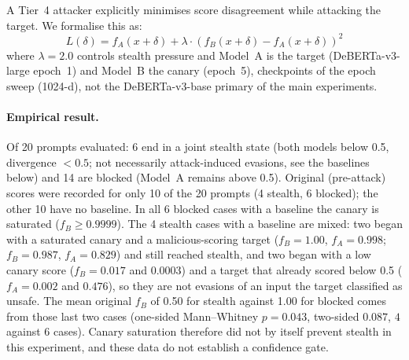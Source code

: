 \documentclass{article}
\begin{document}
A Tier~4 attacker explicitly minimises score disagreement while attacking the target. We formalise this as:
\begin{equation}
\label{eq:div-min-loss}
L(\delta) = f_A(x + \delta) + \lambda \cdot (f_B(x + \delta) - f_A(x + \delta))^2
\end{equation}
where $\lambda = 2.0$ controls stealth pressure and Model~A is the target (DeBERTa-v3-large epoch~1) and Model~B the canary (epoch~5), checkpoints of the epoch sweep (1024-d), not the DeBERTa-v3-base primary of the main experiments.

\paragraph{Empirical result.} Of 20 prompts evaluated: 6 end in a joint stealth state (both models below 0.5, divergence $< 0.5$; not necessarily attack-induced evasions, see the baselines below) and 14 are blocked (Model~A remains above 0.5). Original (pre-attack) scores were recorded for only 10 of the 20 prompts (4 stealth, 6 blocked); the other 10 have no baseline. In all 6 blocked cases with a baseline the canary is saturated ($f_B \geq 0.9999$). The 4 stealth cases with a baseline are mixed: two began with a saturated canary and a malicious-scoring target ($f_B = 1.00$, $f_A = 0.998$; $f_B = 0.987$, $f_A = 0.829$) and still reached stealth, and two began with a low canary score ($f_B = 0.017$ and $0.0003$) and a target that already scored below 0.5 ($f_A = 0.002$ and $0.476$), so they are not evasions of an input the target classified as unsafe. The mean original $f_B$ of 0.50 for stealth against 1.00 for blocked comes from those last two cases (one-sided Mann--Whitney $p = 0.043$, two-sided $0.087$, $4$ against $6$ cases). Canary saturation therefore did not by itself prevent stealth in this experiment, and these data do not establish a confidence gate.
\end{document}
